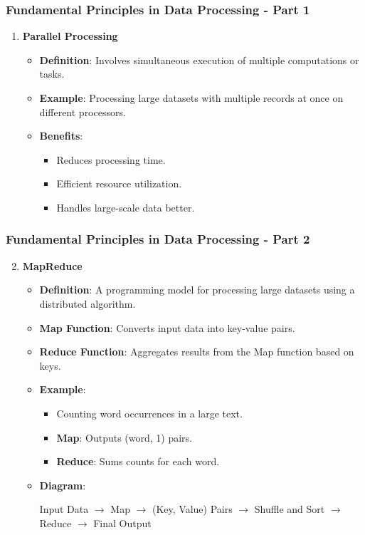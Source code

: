 \documentclass[aspectratio=169]{beamer}
\begin{document}
\begin{frame}[fragile]
    \frametitle{Fundamental Principles in Data Processing - Part 1}
    \begin{enumerate}
        \item \textbf{Parallel Processing}
            \begin{itemize}
                \item \textbf{Definition}: Involves simultaneous execution of multiple computations or tasks.
                \item \textbf{Example}: Processing large datasets with multiple records at once on different processors.
                \item \textbf{Benefits}:
                    \begin{itemize}
                        \item Reduces processing time.
                        \item Efficient resource utilization.
                        \item Handles large-scale data better.
                    \end{itemize}
            \end{itemize}
    \end{enumerate}
\end{frame}

\begin{frame}[fragile]
    \frametitle{Fundamental Principles in Data Processing - Part 2}
    \begin{enumerate}
        \setcounter{enumi}{1}
        \item \textbf{MapReduce}
            \begin{itemize}
                \item \textbf{Definition}: A programming model for processing large datasets using a distributed algorithm.
                \item \textbf{Map Function}: Converts input data into key-value pairs.
                \item \textbf{Reduce Function}: Aggregates results from the Map function based on keys.
                \item \textbf{Example}:
                    \begin{itemize}
                        \item Counting word occurrences in a large text.
                        \item \textbf{Map}: Outputs (word, 1) pairs.
                        \item \textbf{Reduce}: Sums counts for each word.
                    \end{itemize}
                \item \textbf{Diagram}:
                    \begin{center}
                        Input Data $\rightarrow$ Map $\rightarrow$ (Key, Value) Pairs $\rightarrow$ Shuffle and Sort $\rightarrow$ Reduce $\rightarrow$ Final Output
                    \end{center}
            \end{itemize}
    \end{enumerate}
\end{frame}
\end{document}
